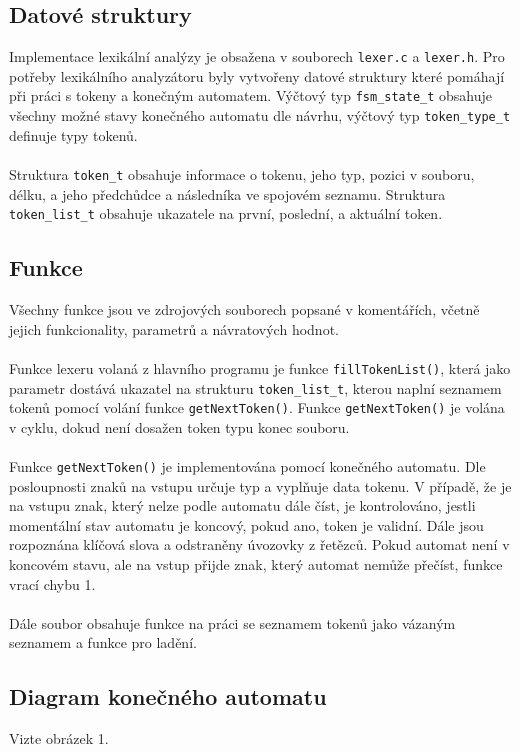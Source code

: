\documentclass[11pt,a4paper]{article}
\begin{document}
\subsection{Datové struktury}
Implementace lexikální analýzy je obsažena v souborech \verb|lexer.c| a \verb|lexer.h|.
Pro potřeby lexikálního analyzátoru byly vytvořeny datové struktury které pomáhají při
práci s tokeny a konečným automatem. Výčtový typ \verb|fsm_state_t| obsahuje všechny možné
stavy konečného automatu dle návrhu, výčtový typ \verb|token_type_t| definuje typy tokenů.
\\ \\
Struktura \verb|token_t| obsahuje informace o tokenu, jeho typ, pozici v souboru, délku,
a jeho předchůdce a následníka ve spojovém seznamu. Struktura \verb|token_list_t| obsahuje
ukazatele na první, poslední, a aktuální token.

\subsection{Funkce}

Všechny funkce jsou ve zdrojových souborech popsané v komentářích, včetně jejich funkcionality, parametrů a návratových hodnot.
\\ \\
Funkce lexeru volaná z hlavního programu je funkce \verb|fillTokenList()|, která jako parametr
dostává ukazatel na strukturu \verb|token_list_t|, kterou naplní seznamem tokenů pomocí volání
funkce \verb|getNextToken()|. Funkce \verb|getNextToken()| je volána v cyklu, dokud není dosažen token
typu konec souboru.
\\ \\
Funkce \verb|getNextToken()| je implementována pomocí konečného automatu. Dle posloupnosti znaků na vstupu
určuje typ a vyplňuje data tokenu. V případě, že je na vstupu znak, který nelze podle automatu dále číst,
je kontrolováno, jestli momentální stav automatu je koncový, pokud ano, token je validní.
Dále jsou rozpoznána klíčová slova a odstraněny úvozovky z řetězců. Pokud automat není v koncovém stavu,
ale na vstup přijde znak, který automat nemůže přečíst, funkce vrací chybu 1.
\\ \\
Dále soubor obsahuje funkce na práci se seznamem tokenů jako vázaným seznamem a funkce pro ladění.

\subsection{Diagram konečného automatu}
Vizte obrázek 1.
\end{document}
